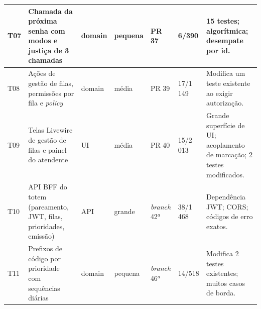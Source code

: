 \begin{quadro}[!htb]
\begin{tabular}{|p{0.8cm}|p{3.6cm}|p{1.1cm}|p{1.2cm}|p{1.3cm}|p{1.3cm}|p{3.6cm}|}
        T07 & Chamada da próxima senha com modos e justiça de 3 chamadas & domain & pequena & PR 37 & 6/390 & 15 testes; algorítmica; desempate por id. \\
        \hline
        T08 & Ações de gestão de filas, permissões por fila e \textit{policy} & domain & média & PR 39 & 17/1\,149 & Modifica um teste existente ao exigir autorização. \\
        \hline
        T09 & Telas Livewire de gestão de filas e painel do atendente & UI & média & PR 40 & 15/2\,013 & Grande superfície de UI; acoplamento de marcação; 2 testes modificados. \\
        \hline
        T10 & API BFF do totem (pareamento, JWT, filas, prioridades, emissão) & API & grande & \textit{branch} 42$^{a}$ & 38/1\,468 & Dependência JWT; CORS; códigos de erro exatos. \\
        \hline
        T11 & Prefixos de código por prioridade com sequências diárias & domain & pequena & \textit{branch} 46$^{a}$ & 14/518 & Modifica 2 testes existentes; muitos casos de borda. \\
        \hline
    \end{tabular}
\end{quadro}
